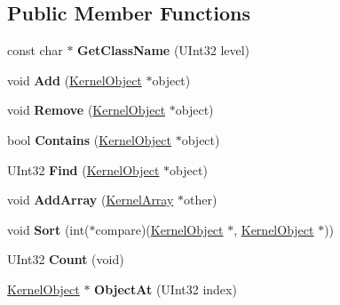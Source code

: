 \subsection*{Public Member Functions}
\begin{DoxyCompactItemize}
\item 
\mbox{\label{class_kernel_array_afe57c8dd8b106940c8923836b85a7f33}} 
const char $\ast$ {\bfseries Get\+Class\+Name} (U\+Int32 level)
\item 
\mbox{\label{class_kernel_array_a4de364a9b094c9429b5b3c4f1b9a5063}} 
void {\bfseries Add} (\hyperlink{class_kernel_object}{Kernel\+Object} $\ast$object)
\item 
\mbox{\label{class_kernel_array_a43a68eb58629b312763b75176dd4ce50}} 
void {\bfseries Remove} (\hyperlink{class_kernel_object}{Kernel\+Object} $\ast$object)
\item 
\mbox{\label{class_kernel_array_afae76475af286540f48413f1d89f4a40}} 
bool {\bfseries Contains} (\hyperlink{class_kernel_object}{Kernel\+Object} $\ast$object)
\item 
\mbox{\label{class_kernel_array_afc788e784b755a5b5b64e09601e89120}} 
U\+Int32 {\bfseries Find} (\hyperlink{class_kernel_object}{Kernel\+Object} $\ast$object)
\item 
\mbox{\label{class_kernel_array_a6e74949b8d7ac7b131926cf7e7d4b487}} 
void {\bfseries Add\+Array} (\hyperlink{class_kernel_array}{Kernel\+Array} $\ast$other)
\item 
\mbox{\label{class_kernel_array_ac5dc640feec59d1590938481f77fdc6b}} 
void {\bfseries Sort} (int($\ast$compare)(\hyperlink{class_kernel_object}{Kernel\+Object} $\ast$, \hyperlink{class_kernel_object}{Kernel\+Object} $\ast$))
\item 
\mbox{\label{class_kernel_array_a1adcfed2be6c9296ed6e43a2d56edbec}} 
U\+Int32 {\bfseries Count} (void)
\item 
\mbox{\label{class_kernel_array_a6898378545baa0d683496b46576641cc}} 
\hyperlink{class_kernel_object}{Kernel\+Object} $\ast$ {\bfseries Object\+At} (U\+Int32 index)

\end{DoxyCompactItemize}
